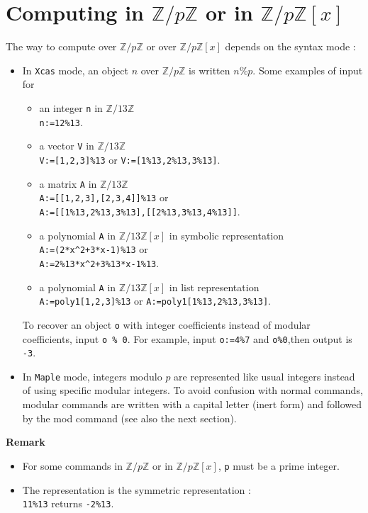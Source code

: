 \documentclass[a4paper,11pt]{book}
\newcommand{\Z}{{\mathbb{Z}}}
\begin{document}
\section{Computing in $\Z/p\Z$ or in $\Z/p\Z[x]$}\label{sec:modulaire}
The way to compute over $\Z/p\Z$ or over $\Z/p\Z[x]$ depends
on the syntax mode :
\begin{itemize}
\item In {\tt Xcas} mode, an object $n$ over $\Z/p\Z$ is written 
$n \%  p$. Some examples of input for
\begin{itemize}
\item an integer {\tt n} in $\Z/13\Z$\\ 
{\tt n:=12\%13}.
\item a vector {\tt V} in $\Z/13\Z$ \\
{\tt V:=[1,2,3]\%13} or 
{\tt V:=[1\%13,2\%13,3\%13]}.
\item a matrix {\tt A} in $\Z/13\Z$ \\
{\tt A:=[[1,2,3],[2,3,4]]\%13} or \\
{\tt A:=[[1\%13,2\%13,3\%13],[[2\%13,3\%13,4\%13]]}.
\item
a polynomial {\tt A} in $\Z/13\Z[x]$ in symbolic representation\\
{\tt A:=(2*x\verb|^|2+3*x-1)\%13} or \\ 
{\tt A:=2\%13*x\verb|^|2+3\%13*x-1\%13}.
\item
a polynomial {\tt A} in $\Z/13\Z[x]$ in list representation\\
{\tt A:=poly1[1,2,3]\%13} or 
{\tt A:=poly1[1\%13,2\%13,3\%13]}.
\end{itemize} 
To recover an object {\tt o} with integer coefficients instead of modular
coefficients, input {\tt o \% 0}. For example, input {\tt o:=4\%7} and
 {\tt o\%0},then output is {\tt -3}.
\item
In {\tt Maple} mode, integers modulo $p$ are represented like
usual integers instead of using specific modular integers.
To avoid confusion with normal commands, modular
commands are written with a capital letter (inert form) and followed
by the mod command (see also the next section).
\end{itemize} 
{\bf Remark} 
\begin{itemize}
\item For some commands in $\Z/p\Z$ or in $\Z/p\Z[x]$, {\tt p} must be
a prime integer.
\item The representation is the symmetric representation :\\
{\tt 11\%13} returns {\tt -2\%13}.
\end{itemize}
\end{document}
